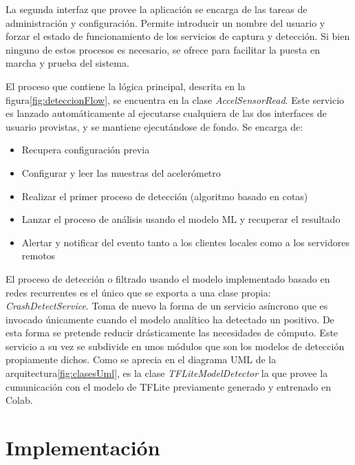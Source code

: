 \documentclass[../tfm.tex]{subfiles}
\begin{document}
La segunda interfaz que provee la aplicación se encarga de las tareas de administración y configuración. Permite introducir un nombre del usuario y forzar el estado de funcionamiento de los servicios de captura y detección. Si bien ninguno de estos procesos es necesario, se ofrece para facilitar la puesta en marcha y prueba del sistema.

El proceso que contiene la lógica principal, descrita en la figura\ref{fig:deteccionFlow}, se encuentra en la clase \textit{AccelSensorRead}. Este servicio es lanzado automáticamente al ejecutarse cualquiera de las dos interfaces de usuario provistas, y se mantiene ejecutándose de fondo. Se encarga de:

\begin{itemize}
  \item Recupera configuración previa
  \item Configurar y leer las muestras del acelerómetro
  \item Realizar el primer proceso de detección (algoritmo basado en cotas)
  \item Lanzar el proceso de análisis usando el modelo ML y recuperar el resultado
  \item Alertar y notificar del evento tanto a los clientes locales como a los servidores remotos
\end{itemize}

El proceso de detección o filtrado usando el modelo implementado basado en redes recurrentes es el único que se exporta a una clase propia: \textit{CrashDetectService}. Toma de nuevo la forma de un servicio asíncrono que es invocado únicamente cuando el modelo analítico ha detectado un positivo. De esta forma se pretende reducir drásticamente las necesidades de cómputo. Este servicio a su vez se subdivide en unos módulos que son los modelos de detección propiamente dichos. Como se aprecia en el diagrama UML de la arquitectura\ref{fig:clasesUml}, es la clase \textit{TFLiteModelDetector} la que provee la cumunicación con el modelo de TFLite previamente generado y entrenado en Colab.


\section{Implementación}\label{desc_impl}
\end{document}
